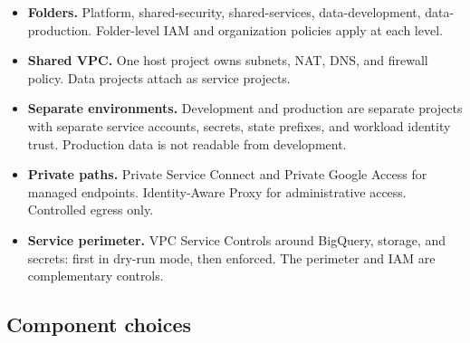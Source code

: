 \documentclass[10pt,a4paper]{article}
\begin{document}
\begin{itemize}
  \item \textbf{Folders.} Platform, shared-security, shared-services,
        data-development, data-production. Folder-level IAM and
        organization policies apply at each level.
  \item \textbf{Shared VPC.} One host project owns subnets, NAT, DNS,
        and firewall policy. Data projects attach as service projects.
  \item \textbf{Separate environments.} Development and production are
        separate projects with separate service accounts, secrets, state
        prefixes, and workload identity trust. Production data is not
        readable from development.
  \item \textbf{Private paths.} Private Service Connect and Private
        Google Access for managed endpoints. Identity-Aware Proxy for
        administrative access. Controlled egress only.
  \item \textbf{Service perimeter.} VPC Service Controls around
        BigQuery, storage, and secrets: first in dry-run mode, then
        enforced. The perimeter and IAM are complementary
        controls.\cite{gcVPCSC}
\end{itemize}

\subsection{Component choices}
\end{document}
